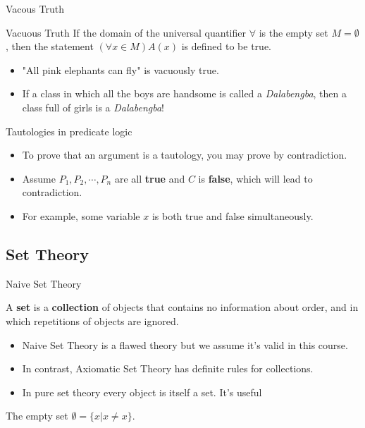\begin{frame}{Vacous Truth}
    \begin{block}{Vacuous Truth}
        If the domain of the universal quantifier $\forall$ is the empty set $M=\emptyset$, then the statement $(\forall x\in M)A(x)$ is defined to be true.
    \end{block}
    \begin{itemize}
        \item "All pink elephants can fly" is vacuously true.
        \item If a class in which all the boys are handsome is called a \emph{Dalabengba}, then a class full of girls is a \emph{Dalabengba}!
    \end{itemize}
\end{frame}

\begin{frame}{Tautologies in predicate logic}
    \begin{itemize}
        \item To prove that an argument is a tautology, you may prove by contradiction.
        \item Assume $P_1, P_2,\cdots, P_n$ are all \textbf{true} and $C$ is \textbf{false}, which will lead to contradiction.
        \item For example, some variable $x$ is both true and false simultaneously.
    \end{itemize}
\end{frame}

\subsection{Set Theory}
\outline

\begin{frame}{Naive Set Theory}
    \begin{definition}
        A \textbf{set} is a \textbf{collection} of objects that contains no information about order, and in which repetitions of objects are ignored.
    \end{definition}
    \begin{itemize}
        \item Naive Set Theory is a flawed theory but we assume it's valid in this course.
        \item In contrast, Axiomatic Set Theory has definite rules for collections.
        \item  In pure set theory every object is itself a set. It's useful 
    \end{itemize}
    \begin{definition}
        The empty set $\emptyset=\{x|x\neq x\}$.
    \end{definition}
\end{frame}

